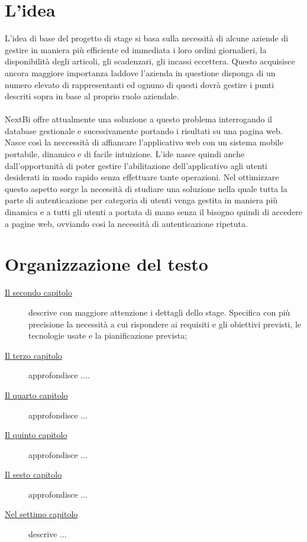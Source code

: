 \section{L'idea}

L'idea di base del progetto di stage si basa sulla necessità di alcune aziende di gestire in maniera più efficiente ed immediata i loro ordini giornalieri, la disponibilità degli articoli, gli scadenzari, gli incassi eccettera. Questo acquisisce ancora maggiore importanza laddove l'azienda in questione disponga di un numero elevato di rappresentanti ed ognuno di questi dovrà gestire i punti descriti sopra in base al proprio ruolo aziendale. \\ \\

NextBi offre attualmente una soluzione a questo problema interrogando il database  gestionale e sucessivamente portando i risultati su una pagina web. Nasce così la neccessità di affiancare l'applicativo web con un sistema mobile portabile, dinamico e di facile intuizione. L'ide nasce quindi anche dall'opportunità di poter gestire l'abilitazione dell'applicativo agli utenti desiderati in modo rapido senza effettuare tante operazioni. Nel ottimizzare questo aspetto sorge la necessità di studiare una soluzione nella quale tutta la parte di autenticazione per categoria di utenti venga gestita in maniera più dinamica e a tutti gli utenti a portata di mano senza il bisogno quindi di accedere a pagine web, ovviando cosi la necessità di autenticazione ripetuta.

\section{Organizzazione del testo}

\begin{description}
    \item[{\hyperref[cap:processi-metodologie]{Il secondo capitolo}}] descrive con maggiore attenzione i dettagli dello stage. Specifica con più precisione la necessità a cui rispondere ai requisiti e gli obiettivi previsti, le tecnologie usate e la pianificazione prevista;
    
    \item[{\hyperref[cap:descrizione-stage]{Il terzo capitolo}}] approfondisce  ....
    
    \item[{\hyperref[cap:analisi-requisiti]{Il quarto capitolo}}] approfondisce ...
    
    \item[{\hyperref[cap:progettazione-codifica]{Il quinto capitolo}}] approfondisce ...
    
    \item[{\hyperref[cap:verifica-validazione]{Il sesto capitolo}}] approfondisce ...
    
    \item[{\hyperref[cap:conclusioni]{Nel settimo capitolo}}] descrive ...
\end{description}

